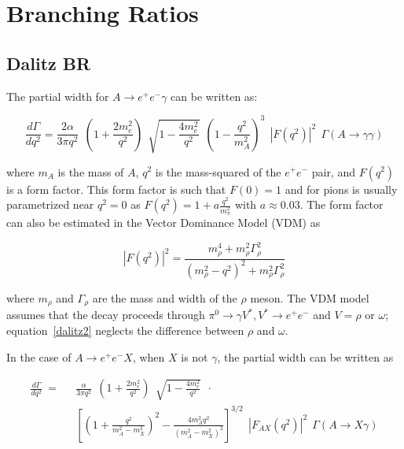 \documentclass[12pt]{article}
\begin{document}
\section{Branching Ratios}

\subsection{Dalitz BR}

The partial width for $A \to e^+ e^- \gamma$ can be written
as\cite{landsberg, bib:ulrik}:

\begin{equation}
\frac{d \Gamma}{d q^2} = \frac{2 \alpha}{3 \pi q^2}~~
(1+\frac{2m_e^2}{q^2})~~\sqrt{1 - \frac{4m_e^2}{q^2}}~~
(1 - \frac{q^2}{m_A^2})^3~~
|F(q^2)|^2 ~~
\Gamma(A \to \gamma \gamma) 
\label{dalitz1}
\end{equation}

\noindent where $m_A$ is the mass of $A$, $q^2$ is the mass-squared of the
$e^+e^-$ pair, 
and $F(q^2)$ is a form factor.
This form factor is such that $F(0)=1$ and for pions is usually
parametrized near $q^2=0$ as $F(q^2) = 1 + a \frac{q^2}{m_\pi^2}$ with
$a \approx 0.03$.  The form factor can also be estimated in the Vector
Dominance Model (VDM) as

\begin{equation}
  |F(q^2)|^2 = \frac{m^4_\rho + m^2_\rho \Gamma^2_\rho}{(m_\rho^2 - q^2)^2 + m^2_\rho \Gamma^2_\rho}
  \label{dalitz2}
\end{equation}

\noindent where $m_\rho$ and $\Gamma_\rho$ are the mass and width of the
$\rho$ meson.  The VDM model assumes that the decay proceeds through
$\pi^0 \to \gamma V^*, V^* \to e^+e^-$ and $V= \rho$ or $\omega$;
equation~\ref{dalitz2} neglects the difference between $\rho$ and $\omega$.

In the case of $A \to e^+ e^- X$, when $X$ is not $\gamma$, the
partial width can be written as 

\begin{equation}
\begin{split}
\frac{d \Gamma}{d q^2}  ~=~~~ & \frac{\alpha}{3 \pi q^2}~~
(1+\frac{2m_e^2}{q^2})~~\sqrt{1 - \frac{4m_e^2}{q^2}}~~ \cdot \\
& \left [ (1+\frac{q^2}{m_A^2-m_X^2})^2 - \frac{4
    m_A^2q^2}{(m_A^2-m_X^2)^2}\right ]^{3/2}~~
|F_{AX}(q^2)|^2 ~~
\Gamma(A \to X \gamma) 
\label{dalitz11}
\end{split}
\end{equation}
\end{document}
